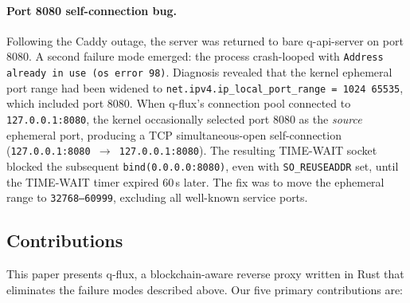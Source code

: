 \documentclass[a4paper, 11pt]{article}
\begin{document}
\paragraph{Port 8080 self-connection bug.}  Following the Caddy outage, the
server was returned to bare q-api-server on port 8080.  A second failure mode
emerged: the process crash-looped with \texttt{Address already in use (os error
98)}.  Diagnosis revealed that the kernel ephemeral port range had been widened
to \texttt{net.ipv4.ip\_local\_port\_range = 1024 65535}, which included port
8080.  When q-flux's connection pool connected to \texttt{127.0.0.1:8080}, the
kernel occasionally selected port 8080 as the \emph{source} ephemeral port,
producing a TCP simultaneous-open self-connection
(\texttt{127.0.0.1:8080~$\to$~127.0.0.1:8080}).  The resulting TIME-WAIT socket
blocked the subsequent \texttt{bind(0.0.0.0:8080)}, even with \texttt{SO\_REUSEADDR}
set, until the TIME-WAIT timer expired 60\,s later.  The fix was to move the
ephemeral range to \texttt{32768--60999}, excluding all well-known service ports.

\subsection*{Contributions}

This paper presents q-flux, a blockchain-aware reverse proxy written in Rust that
eliminates the failure modes described above.  Our five primary contributions are:
\end{document}
